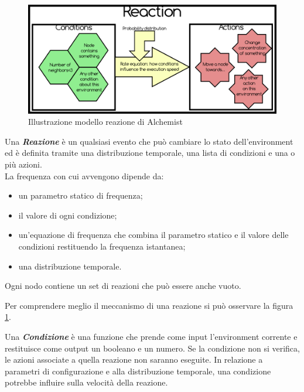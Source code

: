 \documentclass[12pt,a4paper,openright,twoside]{report}
\begin{document}
\begin{figure}[h] %
\begin{center} %
\includegraphics[width=14cm]{images/reaction.png} %
\caption[Illustrazione modello reazione di Alchemist]{Illustrazione modello reazione di Alchemist} \label{fig:alchemistReaction}
\end{center}
\end{figure}

Una \textbf{\textit{Reazione}} \`e un qualsiasi evento che pu\`o cambiare lo stato dell'environment ed \`e definita tramite una distribuzione temporale, una lista di condizioni e una o pi\`u azioni.
\\La frequenza con cui avvengono dipende da:
\begin{itemize}
\item un parametro statico di frequenza;
\item il valore di ogni condizione;
\item un'equazione di frequenza che combina il parametro statico e il valore delle condizioni restituendo la frequenza istantanea;
\item una distribuzione temporale.
\end{itemize}
Ogni nodo contiene un set di reazioni che pu\`o essere anche vuoto.

Per comprendere meglio il meccanismo di una reazione si pu\`o osservare la figura \ref{fig:alchemistReaction}.

Una \textbf{\textit{Condizione}} \`e una funzione che prende come input l'environment corrente e restituisce come output un booleano e un numero. Se la condizione non si verifica, le azioni associate a quella reazione non saranno eseguite. In relazione a parametri di configurazione e alla distribuzione temporale, una condizione potrebbe influire sulla velocit\`a della reazione.
\end{document}
